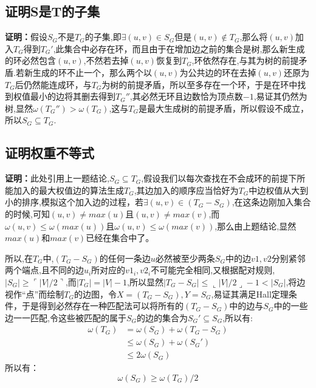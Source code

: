 \documentclass[cn,11pt,chinese]{elegantbook}
\begin{document}
\subsection{证明S是T的子集}

\textbf{证明：}假设$ S_G $不是$ T_G $的子集,即$ \exists (u,v) \in S_G$但是$ (u,v) \notin T_G$,那么将$ (u,v) $加入$ T_G $得到$ T_G' $,此集合中必存在环，而且由于在增加边之前的集合是树,那么新生成的环必然包含$ (u,v) $,不然若去掉$ (u,v) $恢复到$ T_G $,环依然存在,与其为树的前提矛盾.若新生成的环不止一个，那么两个以$ (u,v) $为公共边的环在去掉$ (u,v) $还原为$ T_G $后仍然能连成环，与$ T_G $为树的前提矛盾，所以至多存在一个环，于是在环中找到权值最小的边将其删去得到$ T_G'' $,其必然无环且边数恰为顶点数$ -1 $,易证其仍然为树,显然$ \omega(T_G'') > \omega(T_G) $,这与$ T_G $是最大生成树的前提矛盾，所以假设不成立，所以$ S_G \subseteq T_G $.

\subsection{证明权重不等式}

\textbf{证明：}此处引用上一题结论,$ S_G \subseteq T_G$,假设我们以每次查找在不会成环的前提下所能加入的最大权值边的算法生成$ T_G $,其边加入的顺序应当恰好为$ T_G $中边权值从大到小的排序,模拟这个加入边的过程，若$ \exists (u,v) \in (T_G - S_G) $,在这条边刚加入集合的时候,可知$ (u,v) \neq max(u) $且$ (u,v) \neq max(v) $,而$ \omega(u,v) \le \omega(max(u)) $且$ \omega(u,v) \le \omega(max(v))$,那么由上题结论,显然$ max(u) $和$ max(v) $已经在集合中了。

所以,在$ T_G $中,$ (T_G-S_G) $的任何一条边$ u $必然被至少两条$S_G$中的边$ v1,v2 $分别紧邻两个端点,且不同的边$ u_i $所对应的$ v1_i,v2_i $不可能完全相同,又根据配对规则,$ |S_G| \ge \ulcorner |V|/2  \urcorner $,而$ |T_G| = |V| - 1 $,所以显然$ |T_G-S_G|\le \llcorner |V|/2 \lrcorner -1 < |S_G| $,将边视作“点”而绘制$ T_G $的边图，令$ X = (T_G-S_G),Y = S_G $,易证其满足Hall定理条件，于是得到必然存在一种匹配法可以将所有的$ (T_G-S_G) $中的边与$ S_G $中的一些边一一匹配,令这些被匹配的属于$ S_G $的边的集合为$ S_G' \subseteq S_G $,所以有:
\begin{equation}
	\begin{aligned}
		\omega(T_G) &= \omega(S_G) + \omega(T_G-S_G) \\
					&\le \omega(S_G) + \omega(S_G') \\
					&\le 2\omega(S_G) 
	\end{aligned}
	\nonumber
\end{equation}
所以有：
\begin{equation}
	\omega(S_G) \ge \omega(T_G)/2 \nonumber
\end{equation}
\end{document}
